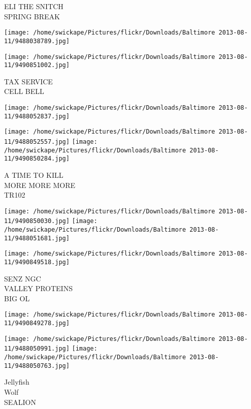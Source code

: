 \documentclass[10pt,letterpaper]{article}
\begin{document}
ELI THE SNITCH\\
SPRING BREAK\\
\pagebreak

\texttt{[image: /home/swickape/Pictures/flickr/Downloads/Baltimore 2013-08-11/9488038789.jpg]}

\vspace{0.25in}
\texttt{[image: /home/swickape/Pictures/flickr/Downloads/Baltimore 2013-08-11/9490851002.jpg]}

TAX SERVICE\\
CELL BELL\\
\pagebreak

\texttt{[image: /home/swickape/Pictures/flickr/Downloads/Baltimore 2013-08-11/9488052837.jpg]}

\vspace{0.25in}
\texttt{[image: /home/swickape/Pictures/flickr/Downloads/Baltimore 2013-08-11/9488052557.jpg]}
\texttt{[image: /home/swickape/Pictures/flickr/Downloads/Baltimore 2013-08-11/9490850284.jpg]}

A TIME TO KILL\\
MORE MORE MORE\\
TR102\\
\pagebreak

\texttt{[image: /home/swickape/Pictures/flickr/Downloads/Baltimore 2013-08-11/9490850030.jpg]}
\texttt{[image: /home/swickape/Pictures/flickr/Downloads/Baltimore 2013-08-11/9488051681.jpg]}

\vspace{0.25in}
\texttt{[image: /home/swickape/Pictures/flickr/Downloads/Baltimore 2013-08-11/9490849518.jpg]}

SENZ NGC\\
VALLEY PROTEINS\\
BIG OL\\
\pagebreak

\texttt{[image: /home/swickape/Pictures/flickr/Downloads/Baltimore 2013-08-11/9490849278.jpg]}

\vspace{0.25in}
\texttt{[image: /home/swickape/Pictures/flickr/Downloads/Baltimore 2013-08-11/9488050991.jpg]}
\texttt{[image: /home/swickape/Pictures/flickr/Downloads/Baltimore 2013-08-11/9488050763.jpg]}

Jellyfish\\
Wolf\\
SEALION\\
\pagebreak
\end{document}
